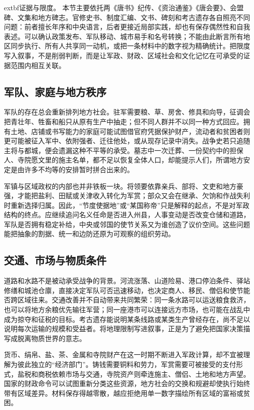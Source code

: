 \noindent	extbf{证据与限度。} 本节主要依托两《唐书》纪传、《资治通鉴》《唐会要》、会盟碑、文集和地方碑志。官修史书、制度汇编、文书、碑刻和考古遗存各自照亮不同问题：前者擅长年序和中央语言，后者更接近局部实践，却也有保存偶然性和自我表述。可以确认政策发布、军队移动、城市易手和名号转换；不能由此断言所有地区同步执行、所有人共享同一动机，或把一条材料中的数字视为精确统计。把限度写入叙事，不是削弱判断，而是让军政、财政、区域社会和文化记忆在可承受的证据范围内相互关联。

\subsection{军队、家庭与地方秩序}
军队的存在总会重新排列地方社会。驻军需要粮、草、房舍、修具和向导，征调会把青壮年、牲畜和船只从原有生产中抽走；但不同人群并不以同一种方式回应。拥有土地、店铺或书写能力的家庭可能试图借官府凭据保护财产，流动者和贫困者则更可能被征入军中、依附强者、迁往他处，或从现存记录中消失。战争史若只追随主将与都城，便会遗漏这种不平等的承受。墓志中一次迁葬、一份契约中的担保人、寺院愿文里的施主名单，都不足以恢复全体人口，却能提示人们，所谓地方安定是由许多不均等的安排暂时拼合出来的。

军镇与区域政权的内部也并非铁板一块。将领要依靠亲兵、部将、文吏和地方豪强，才能把盐利、田赋或关津收入转化为军赏；部众又会在继承、欠饷和作战失利时重新选择归属。因此，“节度使据地”或“某国称帝”只是解释的起点，不是对军政结构的终点。应继续追问名义任命是否进入州县，人事变动是否改变仓储和道路，军队是否拥有稳定补给，中央或邻国的使节关系又为谁创造了议价空间。这些问题能把抽象的割据、统一和边防还原为可观察的组织劳动。

\subsection{交通、市场与物质条件}
道路和水路不是被动承受战争的背景。河流涨落、山道险易、港口停泊条件、驿站修缮和城池仓廪，直接决定军队可否迅速移动，也决定商人、移民、僧侣和使节能否跨区域往来。交通改善并不自动带来共同繁荣：同一条水路可以运送粮食救济，也可以将地方余粮优先输往军营；同一座港市可以连接远方市场，也可能在战乱中成为掠夺和征税的目标。考古遗存能说明某条线路或某类生产曾经存在，尚不足以说明每次运输的规模和受益者。将地理限制写进叙事，正是为了避免把国家决策描写成脱离物质世界的意志。

货币、绢帛、盐、茶、金属和寺院财产在这一时期不断进入军政计算，却不宜被理解为彼此独立的“经济部门”。铸钱需要铜料和劳力，军赏需要可被接受的支付形式，盐税和商税依赖市场与交通，寺院资产则牵连施主、僧侣、土地和地方声望。国家的财政命令可以试图重新分类这些资源，地方社会的交换和规避却使执行始终带有区域差异。材料保存得越零散，越应拒绝用单一数字描绘所有区域的富裕或贫困。


